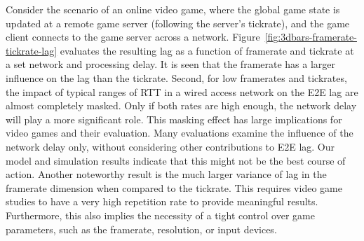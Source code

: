 Consider the scenario of an online video game, where the global game state is updated at a remote game server (following the server's tickrate), and the game client connects to the game server across a network. Figure~\ref{fig:3dbars-framerate-tickrate-lag} evaluates the resulting lag as a function of framerate and tickrate at a set network and processing delay. It is seen that the framerate has a larger influence on the lag than the tickrate. Second, for low framerates and tickrates, the impact of typical ranges of \acrshort{RTT} in a wired access network on the \gls{E2E} lag are almost completely masked. Only if both rates are high enough, the network delay will play a more significant role. This masking effect has large implications for video games and their evaluation. Many evaluations examine the influence of the network delay only, without considering other contributions to \gls{E2E} lag. Our model and simulation results indicate that this might not be the best course of action. Another noteworthy result is the much larger variance of lag in the framerate dimension when compared to the tickrate. This requires video game studies to have a very high repetition rate to provide meaningful results. Furthermore, this also implies the necessity of a tight control over game parameters, such as the framerate, resolution, or input devices.




